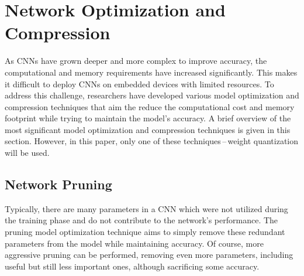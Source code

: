 






\section{Network Optimization and Compression}

As CNNs have grown deeper and more complex to improve accuracy, the
computational and memory requirements have increased significantly. This makes
it difficult to deploy CNNs on embedded devices with limited resources. To
address this challenge, researchers have developed various model optimization
and compression techniques that aim the reduce the computational cost and memory
footprint while trying to maintain the model's accuracy. A brief overview of the
most significant model optimization and compression techniques is given in this
section. However, in this paper, only one of these techniques\,--\,weight
quantization will be used.


\subsection{Network Pruning}

Typically, there are many parameters in a CNN which were not utilized during the
training phase and do not contribute to the network's performance. The pruning
model optimization technique aims to simply remove these redundant parameters
from the model while maintaining accuracy. Of course, more aggressive pruning
can be performed, removing even more parameters, including useful but still less
important ones, although sacrificing some accuracy.

